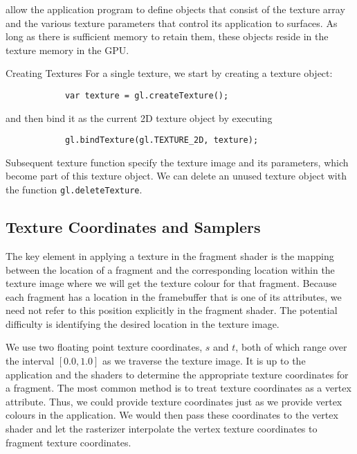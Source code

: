 \documentclass[../COS3712_Notes.tex]{subfiles}
\begin{document}
         allow the application program to define objects that consist
        of the texture array and the various texture parameters that control its application
        to surfaces.
        As long as there is sufficient memory to retain them, these objects reside in the
        texture memory in the GPU.

        \begin{sidenote}{Creating Textures}
          For a single texture, we start by creating a texture object:
          \begin{verbatim}
            var texture = gl.createTexture();
          \end{verbatim}
          and then bind it as the current 2D texture object by executing
          \begin{verbatim}
            gl.bindTexture(gl.TEXTURE_2D, texture);
          \end{verbatim}
          Subsequent texture function specify the texture image and its parameters,
          which become part of this texture object.
          We can delete an unused texture object with the function
          \texttt{gl.deleteTexture}.
        \end{sidenote}

      \subsection{Texture Coordinates and Samplers}
        The key element in applying a texture in the fragment shader is the mapping
        between the location of a fragment and the corresponding location within the texture image
        where we will get the texture colour for that fragment.
        Because each fragment has a location in the framebuffer that is one of its attributes,
        we need not refer to this position explicitly in the fragment shader.
        The potential difficulty is identifying the desired location in the texture image.

        We use two floating point texture coordinates, $s$ and $t$,
        both of which range over the interval $[0.0, 1.0]$ as we traverse the texture image.
        It is up to the application and the shaders to determine the appropriate texture
        coordinates for a fragment.
        The most common method is to treat texture coordinates as a vertex attribute.
        Thus, we could provide texture coordinates just as we provide vertex colours
        in the application.
        We would then pass these coordinates to the vertex shader and let the rasterizer
        interpolate the vertex texture coordinates to fragment texture coordinates.
\end{document}
